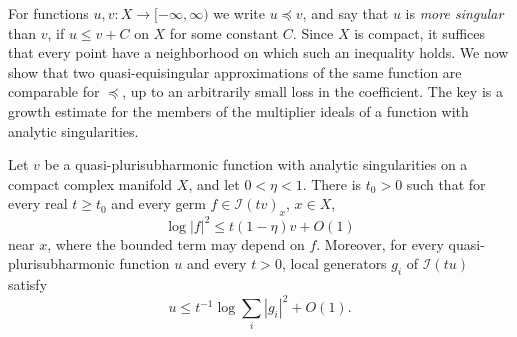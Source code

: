 For functions $u,v\colon X\to[-\infty,\infty)$ we write $u\preceq v$, and say that $u$ is \emph{more singular} than $v$, if $u\leq v+C$ on $X$ for some constant $C$. Since $X$ is compact, it suffices that every point have a neighborhood on which such an inequality holds. We now show that two quasi-equisingular approximations of the same function are comparable for $\preceq$, up to an arbitrarily small loss in the coefficient. The key is a growth estimate for the members of the multiplier ideals of a function with analytic singularities.

\begin{lemma}\label{lem:analytic-weighted-integrability-growth}
Let $v$ be a quasi-plurisubharmonic function with analytic singularities on a compact complex manifold $X$, and let $0<\eta<1$. There is $t_0>0$ such that for every real $t\geq t_0$ and every germ $f\in\mathcal I(tv)_x$, $x\in X$,
\[
 \log|f|^2\leq t(1-\eta)v+O(1)
\]
near $x$, where the bounded term may depend on $f$. Moreover, for every quasi-plurisubharmonic function $u$ and every $t>0$, local generators $g_i$ of $\mathcal I(tu)$ satisfy
\[
 u\leq t^{-1}\log\sum_i|g_i|^2+O(1).
\]
\end{lemma}
